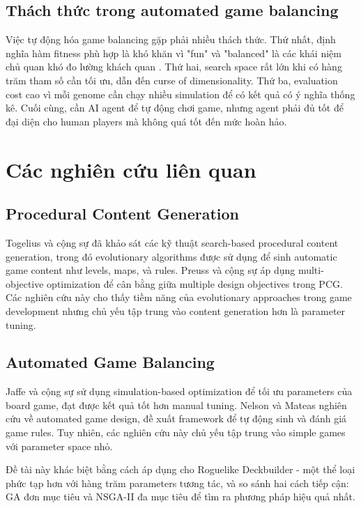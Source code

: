 \subsection{Thách thức trong automated game balancing}

Việc tự động hóa game balancing gặp phải nhiều thách thức. Thứ nhất, định nghĩa hàm fitness phù hợp là khó khăn vì "fun" và "balanced" là các khái niệm chủ quan khó đo lường khách quan \cite{nelson2016towards}. Thứ hai, search space rất lớn khi có hàng trăm tham số cần tối ưu, dẫn đến curse of dimensionality. Thứ ba, evaluation cost cao vì mỗi genome cần chạy nhiều simulation để có kết quả có ý nghĩa thống kê. Cuối cùng, cần AI agent để tự động chơi game, nhưng agent phải đủ tốt để đại diện cho human players mà không quá tốt đến mức hoàn hảo.

\section{Các nghiên cứu liên quan}

\subsection{Procedural Content Generation}

Togelius và cộng sự \cite{togelius2011search} đã khảo sát các kỹ thuật search-based procedural content generation, trong đó evolutionary algorithms được sử dụng để sinh automatic game content như levels, maps, và rules. Preuss và cộng sự \cite{preuss2012multiobjective} áp dụng multi-objective optimization để cân bằng giữa multiple design objectives trong PCG. Các nghiên cứu này cho thấy tiềm năng của evolutionary approaches trong game development nhưng chủ yếu tập trung vào content generation hơn là parameter tuning.

\subsection{Automated Game Balancing}

Jaffe và cộng sự \cite{jaffe2012optimizing} sử dụng simulation-based optimization để tối ưu parameters của board game, đạt được kết quả tốt hơn manual tuning. Nelson và Mateas \cite{nelson2016towards} nghiên cứu về automated game design, đề xuất framework để tự động sinh và đánh giá game rules. Tuy nhiên, các nghiên cứu này chủ yếu tập trung vào simple games với parameter space nhỏ.

Đề tài này khác biệt bằng cách áp dụng cho Roguelike Deckbuilder - một thể loại phức tạp hơn với hàng trăm parameters tương tác, và so sánh hai cách tiếp cận: GA đơn mục tiêu và NSGA-II đa mục tiêu để tìm ra phương pháp hiệu quả nhất.
